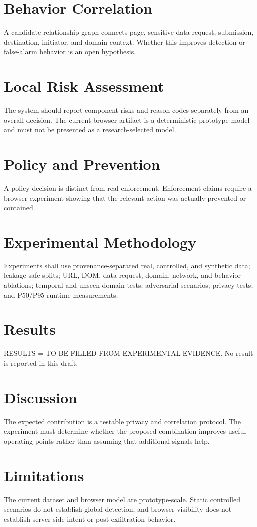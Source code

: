 \documentclass[journal]{IEEEtran}
\begin{document}
\section{Behavior Correlation}
A candidate relationship graph connects page, sensitive-data request, submission, destination, initiator, and domain context. Whether this improves detection or false-alarm behavior is an open hypothesis.

\section{Local Risk Assessment}
The system should report component risks and reason codes separately from an overall decision. The current browser artifact is a deterministic prototype model and must not be presented as a research-selected model.

\section{Policy and Prevention}
A policy decision is distinct from real enforcement. Enforcement claims require a browser experiment showing that the relevant action was actually prevented or contained.

\section{Experimental Methodology}
Experiments shall use provenance-separated real, controlled, and synthetic data; leakage-safe splits; URL, DOM, data-request, domain, network, and behavior ablations; temporal and unseen-domain tests; adversarial scenarios; privacy tests; and P50/P95 runtime measurements.

\section{Results}
RESULTS = TO BE FILLED FROM EXPERIMENTAL EVIDENCE. No result is reported in this draft.

\section{Discussion}
The expected contribution is a testable privacy and correlation protocol. The experiment must determine whether the proposed combination improves useful operating points rather than assuming that additional signals help.

\section{Limitations}
The current dataset and browser model are prototype-scale. Static controlled scenarios do not establish global detection, and browser visibility does not establish server-side intent or post-exfiltration behavior.
\end{document}
